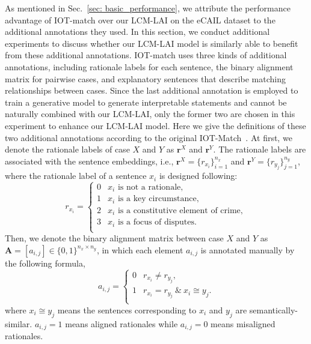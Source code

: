 As mentioned in Sec.~\ref{sec: basic_performance}, we attribute the performance advantage of IOT-match over our LCM-LAI on the eCAIL dataset to the additional annotations they used.
In this section, we conduct additional experiments to discuss whether our LCM-LAI model is similarly able to benefit from these additional annotations.
IOT-match uses three kinds of additional annotations, including rationale labels for each sentence, the binary alignment matrix for pairwise cases, and explanatory sentences that describe matching relationships between cases.
Since the last additional annotation is employed to train a generative model to generate interpretable statements and cannot be naturally combined with our LCM-LAI,
only the former two are chosen in this experiment to enhance our LCM-LAI model.
Here we give the definitions of these two additional annotations according to the original IOT-Match~\cite{yu2022Explainable}.
At first, we denote the rationale labels of case $X$ and $Y$ as $\mathbf{r}^{X}$ and $\mathbf{r}^{Y}$.
The rationale labels are associated with the sentence embeddings, 
i.e., $\mathbf{r}^{X}=\{r_{x_i}\}_{i=1}^{n_x}$ and $\mathbf{r}^{Y}=\{r_{y_j}\}_{j=1}^{n_y}$, where the rationale label of a sentence $x_i$ is designed following:
$$
r_{x_{i}} =
\begin{cases}
0 & x_{i} \text{ is not a rationale}, \\
1 & x_{i} \text{ is a key circumstance}, \\
2 & x_{i} \text{ is a constitutive element of crime}, \\
3 & x_{i} \text{ is a focus of disputes}. \\
\end{cases}
$$
Then, we denote the binary alignment matrix between case $X$ and $Y$ as $\mathbf{A}=[a_{i,j}]\in \{0, 1\}^{n_x \times n_y}$, in which each element $a_{i,j}$ is annotated manually by the following formula,
$$
a_{i, j} =
\begin{cases}
0 & r_{x_i} \neq r_{y_j}, \\
1 & r_{x_i} = r_{y_j} \ \& \ x_i \cong y_j. \\
\end{cases}
$$
where $x_i \cong y_j$ means the sentences corresponding to $x_i$ and $y_j$
are semantically-similar. $a_{i,j}= 1$ means aligned rationales while
$a_{i,j}=0$ means misaligned rationales.


